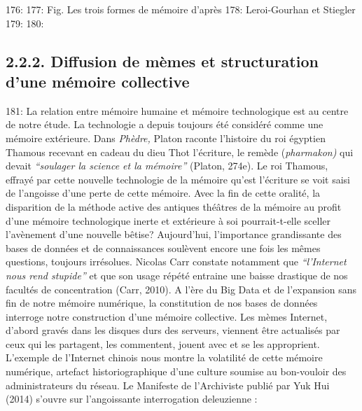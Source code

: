 176: 
177: Fig. Les trois formes de m\'emoire d{\textquoteright}apr\`es
178: Leroi-Gourhan et Stiegler
179: 
180: \subsection[Diffusion de m\`emes et structuration d{\textquoteright}une m\'emoire collective]{2.2.2. Diffusion de m\`emes et structuration d{\textquoteright}une m\'emoire collective}
181: La relation entre m\'emoire humaine et m\'emoire technologique est au centre de notre \'etude. La technologie a depuis toujours \'et\'e consid\'er\'e comme une m\'emoire ext\'erieure. Dans \textit{Ph\`edre, }Platon raconte l{\textquoteright}histoire du roi \'egyptien Thamous recevant en cadeau du dieu Thot l{\textquoteright}\'ecriture, le rem\`ede (\textit{pharmakon) }qui devait \textit{{\textquotedblleft}soulager la science et la m\'emoire{\textquotedblright} }(Platon, 274e). Le roi Thamous, effray\'e par cette nouvelle technologie de la m\'emoire qu{\textquoteright}est l{\textquoteright}\'ecriture se voit saisi de l{\textquoteright}angoisse d{\textquoteright}une perte de cette m\'emoire. Avec la fin de cette oralit\'e, la disparition de la m\'ethode active des antiques th\'e\^atres de la m\'emoire au profit d{\textquoteright}une m\'emoire technologique inerte et ext\'erieure \`a soi pourrait-t-elle sceller l{\textquoteright}av\`enement d{\textquoteright}une nouvelle b\^etise? Aujourd{\textquoteright}hui, l{\textquoteright}importance grandissante des bases de donn\'ees et de connaissances soul\`event encore une fois les m\^emes questions, toujours irr\'esolues. Nicolas Carr constate notamment que \textit{{\textquotedblleft}l{\textquoteright}Internet nous rend stupide{\textquotedblright}} et que son usage r\'ep\'et\'e entraine une baisse drastique de nos facult\'es de concentration (Carr, 2010). A l{\textquoteright}\`ere du Big Data et de l{\textquoteright}expansion sans fin de notre m\'emoire num\'erique, la constitution de nos bases de donn\'ees interroge notre construction d{\textquoteright}une m\'emoire collective. Les m\`emes Internet, d{\textquoteright}abord grav\'es dans les disques durs des serveurs, viennent \^etre actualis\'es par ceux qui les partagent, les commentent, jouent avec et se les approprient. L{\textquoteright}exemple de l{\textquoteright}Internet chinois nous montre la volatilit\'e de cette m\'emoire num\'erique, artefact historiographique d{\textquoteright}une culture soumise au bon-vouloir des administrateurs du r\'eseau. Le Manifeste de l{\textquoteright}Archiviste publi\'e par Yuk Hui (2014) s{\textquoteright}ouvre sur l{\textquoteright}angoissante interrogation deleuzienne :  \begin{quote}

\end{quote}
